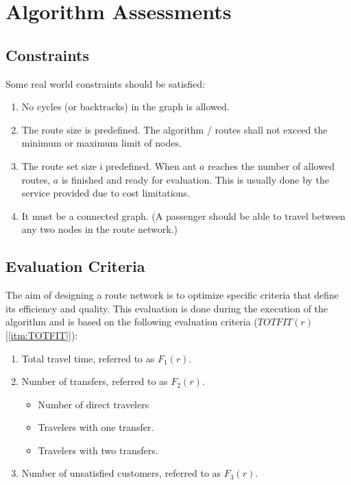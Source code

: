 \section{Algorithm Assessments}

\subsection{Constraints}
Some real world constraints should be satisfied:
\begin{enumerate}
\item \label{itm:constraintCycles} No cycles (or backtracks) in the graph is allowed.
\item \label{itm:constraintRouteSize} The route size is predefined. The algorithm / routes shall not exceed the minimum or maximum limit of nodes.
\item \label{itm:constraintRouteSetSize} The route set size i predefined. When ant $a$ reaches the number of allowed routes, $a$ is finished and ready for evaluation. This is usually done by the service provided due to cost limitations.
\item \label{itm:criteriaConnectedGraph} It must be a connected graph. (A passenger should be able to travel between any two nodes in the route network.) 
\end{enumerate}

\subsection{Evaluation Criteria} 
The aim of designing a route network is to optimize specific criteria that define its efficiency and quality. This evaluation is done during the execution of the algorithm and is based on the following evaluation criteria ($TOTFIT(r)$ [\ref{itm:TOTFIT}]):
\begin{enumerate}
\item \label{itm:criteriaTotalTravelTime} Total travel time, referred to as $F_1(r)$.
\item \label{itm:f2} Number of transfers, referred to as $F_2(r)$.
\begin{itemize}
\item Number of direct travelers
\item Travelers with one transfer.
\item Travelers with two transfers.
\end{itemize}
\item \label{itm:TODO} Number of unsatisfied customers, referred to as $F_3(r)$. 
\end{enumerate}



